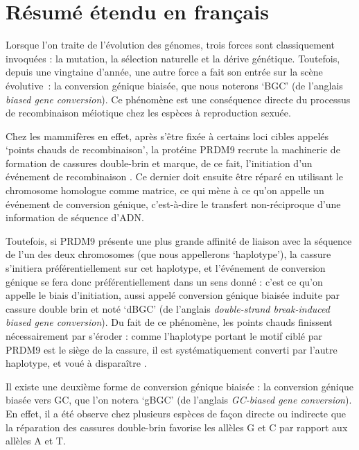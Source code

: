 \section*{Résumé étendu en français}

{

Lorsque l'on traite de l'évolution des génomes, trois forces sont classiquement invoquées : la mutation, la sélection naturelle et la dérive génétique.
%
Toutefois, depuis une vingtaine d'année, une autre force a fait son entrée sur la scène évolutive~: la conversion génique biaisée, que nous noterons ‘BGC’ (de l'anglais \textit{biased gene conversion}).
Ce phénomène est une conséquence directe du processus de recombinaison méiotique chez les espèces à reproduction sexuée.

Chez les mammifères en effet, après s'être fixée à certains loci cibles appelés ‘points chauds de recombinaison’, la protéine PRDM9 recrute la machinerie de formation de cassures double-brin et marque, de ce fait, l'initiation d'un événement de recombinaison \citep{baudat2010prdm9,myers2010drive,parvanov2010prdm9}.
Ce dernier doit ensuite être réparé en utilisant le chromosome homologue comme matrice, ce qui mène à ce qu'on appelle un événement de conversion génique, c'est-à-dire le transfert non-réciproque d'une information de séquence d'ADN\@.

Toutefois, si PRDM9 présente une plus grande affinité de liaison avec la séquence de l'un des deux chromosomes (que nous appellerons ‘haplotype’), la cassure s'initiera préférentiellement sur cet haplotype, et l'événement de conversion génique se fera donc préférentiellement dans un sens donné : c'est ce qu'on appelle le biais d'initiation, aussi appelé conversion génique biaisée induite par cassure double brin et noté ‘dBGC’ (de l'anglais \textit{double-strand break-induced biased gene conversion}).
Du fait de ce phénomène, les points chauds finissent nécessairement par s'éroder : comme l'haplotype portant le motif ciblé par PRDM9 est le siège de la cassure, il est systématiquement converti par l'autre haplotype, et voué à dispara\^itre \citep{boulton1997hotspot}.

Il existe une deuxième forme de conversion génique biaisée : la conversion génique biasée vers GC, que l'on notera ‘gBGC’ (de l'anglais \textit{GC-biased gene conversion}).
En effet, il a été observe chez plusieurs espèces 
de façon directe \citep{mancera2008highresolution, si2015widely, williams2015noncrossover, halldorsson2016rate, keith2016high, smeds2016highresolution}
ou indirecte \citep{escobar2011gcbiased,pessia2012evidence,figuet2014biased}
que la réparation des cassures double-brin favorise les allèles G et C par rapport aux allèles A et T\@.\\


}
